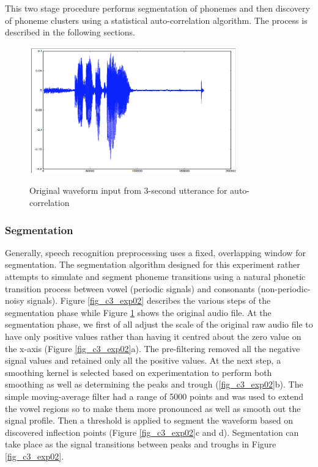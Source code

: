 This two stage procedure performs segmentation of phonemes and then discovery of phoneme clusters using a statistical auto-correlation algorithm.  The process is described in the following sections.
\begin{figure}
\centering
  \includegraphics[width=9cm]{thesis/images/corr}\\
  \caption{Original waveform input from 3-second utterance for auto-correlation}\label{fig_c3_exp01}
\end{figure}

\subsubsection{Segmentation}
Generally, speech recognition preprocessing uses a fixed, overlapping window for segmentation. The segmentation algorithm designed for this experiment rather attempts to simulate and segment phoneme transitions using a natural phonetic  transition process between vowel (periodic signals) and consonants (non-periodic-noisy signals). Figure \ref{fig_c3_exp02} describes the various steps of the segmentation phase while Figure \ref{fig_c3_exp01} shows the original audio file. At the segmentation phase, we first of all adjust the scale of the original raw audio file to have only positive values rather than having it centred about the zero value on the x-axis (Figure \ref{fig_c3_exp02}a).  The pre-filtering removed all the negative signal values and retained only all the positive values.  At the next step, a smoothing kernel is selected based on experimentation to perform both smoothing as well as determining the peaks and trough (\ref{fig_c3_exp02}b).   The simple moving-average filter had a range of 5000 points and was used to extend the vowel regions so to make them more pronounced as well as smooth out the signal profile.    Then a threshold is applied to segment the waveform based on discovered inflection points (Figure \ref{fig_c3_exp02}c and d).  Segmentation can take place as the signal transitions between peaks and troughs in Figure \ref{fig_c3_exp02}.


